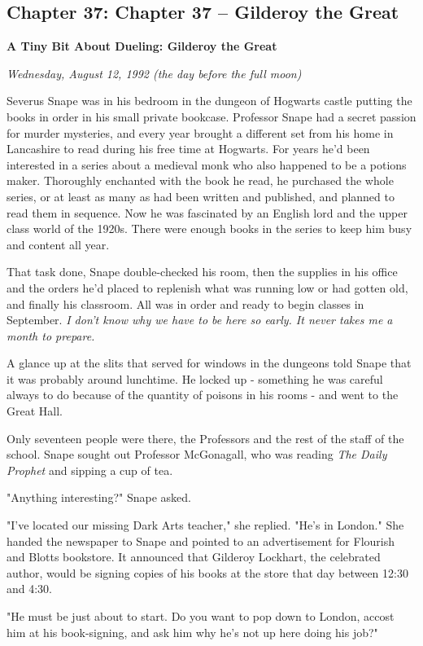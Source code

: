 \documentclass[a4paper,11pt]{article}
\begin{document}
\subsection{Chapter 37: Chapter 37 – Gilderoy the Great}

\textbf{A Tiny Bit About Dueling: Gilderoy the Great}

\emph{Wednesday, August 12, 1992 (the day before the full moon)}

Severus Snape was in his bedroom in the dungeon of Hogwarts castle putting the books in order in his small private bookcase. Professor Snape had a secret passion for murder mysteries, and every year brought a different set from his home in Lancashire to read during his free time at Hogwarts. For years he'd been interested in a series about a medieval monk who also happened to be a potions maker. Thoroughly enchanted with the book he read, he purchased the whole series, or at least as many as had been written and published, and planned to read them in sequence. Now he was fascinated by an English lord and the upper class world of the 1920s. There were enough books in the series to keep him busy and content all year.

That task done, Snape double-checked his room, then the supplies in his office and the orders he'd placed to replenish what was running low or had gotten old, and finally his classroom. All was in order and ready to begin classes in September. \emph{I don't know why we have to be here so early. It never takes me a month to prepare.}

A glance up at the slits that served for windows in the dungeons told Snape that it was probably around lunchtime. He locked up - something he was careful always to do because of the quantity of poisons in his rooms - and went to the Great Hall.

Only seventeen people were there, the Professors and the rest of the staff of the school. Snape sought out Professor McGonagall, who was reading \emph{The Daily Prophet} and sipping a cup of tea.

"Anything interesting?" Snape asked.

"I've located our missing Dark Arts teacher," she replied. "He's in London." She handed the newspaper to Snape and pointed to an advertisement for Flourish and Blotts bookstore. It announced that Gilderoy Lockhart, the celebrated author, would be signing copies of his books at the store that day between 12:30 and 4:30.

"He must be just about to start. Do you want to pop down to London, accost him at his book-signing, and ask him why he's not up here doing his job?"
\end{document}
